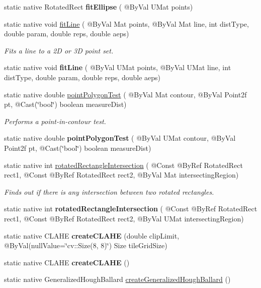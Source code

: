 \begin{DoxyCompactItemize}
static native Rotated\+Rect {\bfseries fit\+Ellipse} ( @By\+Val U\+Mat points)
\item 
static native void \hyperlink{group__imgproc__shape_ga081f0e410b01a81bbfe62c828ebb3c6f}{fit\+Line} ( @By\+Val Mat points, @By\+Val Mat line, int dist\+Type, double param, double reps, double aeps)
\begin{DoxyCompactList}\small\item\em Fits a line to a 2D or 3D point set. \end{DoxyCompactList}\item 
static native void {\bfseries fit\+Line} ( @By\+Val U\+Mat points, @By\+Val U\+Mat line, int dist\+Type, double param, double reps, double aeps)
\item 
static native double \hyperlink{group__imgproc__shape_gaf6f02003be04d7a37eff3af25946ff77}{point\+Polygon\+Test} ( @By\+Val Mat contour, @By\+Val Point2f pt, @Cast(\char`\"{}bool\char`\"{}) boolean measure\+Dist)
\begin{DoxyCompactList}\small\item\em Performs a point-\/in-\/contour test. \end{DoxyCompactList}\item 
static native double {\bfseries point\+Polygon\+Test} ( @By\+Val U\+Mat contour, @By\+Val Point2f pt, @Cast(\char`\"{}bool\char`\"{}) boolean measure\+Dist)
\item 
static native int \hyperlink{group__imgproc__shape_gadcfa20fed89c804a31f05ae6e1023379}{rotated\+Rectangle\+Intersection} ( @Const @By\+Ref Rotated\+Rect rect1, @Const @By\+Ref Rotated\+Rect rect2, @By\+Val Mat intersecting\+Region)
\begin{DoxyCompactList}\small\item\em Finds out if there is any intersection between two rotated rectangles. \end{DoxyCompactList}\item 
static native int {\bfseries rotated\+Rectangle\+Intersection} ( @Const @By\+Ref Rotated\+Rect rect1, @Const @By\+Ref Rotated\+Rect rect2, @By\+Val U\+Mat intersecting\+Region)
\item 
static native C\+L\+A\+HE {\bfseries create\+C\+L\+A\+HE} (double clip\+Limit, @By\+Val(null\+Value=\char`\"{}cv\+::\+Size(8, 8)\char`\"{}) Size tile\+Grid\+Size)
\item 
static native C\+L\+A\+HE {\bfseries create\+C\+L\+A\+HE} ()
\item 
static native Generalized\+Hough\+Ballard \hyperlink{group__imgproc__filter_ga9184647c04f254c7cfa32edf2cb43bec}{create\+Generalized\+Hough\+Ballard} ()

\end{DoxyCompactItemize}
